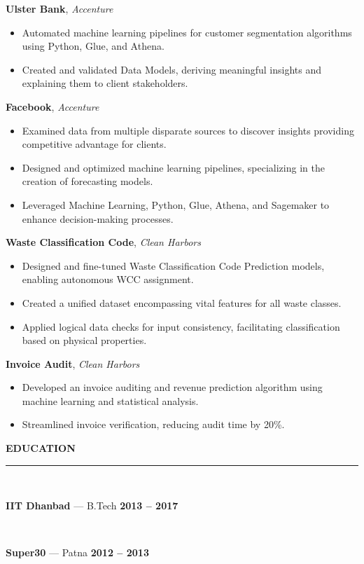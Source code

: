 \documentclass[a4paper,9pt]{article}
\newcommand{\cvsection}[2]{%
  \vspace{4pt}
  {\color{primary}\faIcon{#1}\hspace{6pt}\textbf{\fontsize{10pt}{12pt}\selectfont\uppercase{#2}}}\\[-2pt]
  \color{primary}\rule{\linewidth}{0.8pt}\\[-2pt]
  \color{textcolor}
}
\newcommand{\projectentry}[2]{%
  \vspace{2pt}
  \parbox[t]{\linewidth}{\textbf{\textcolor{projectcolor}{#1}}, \textit{\textcolor{primary}{#2}}}
}
\newcommand{\educationentry}[3]{%
  \vspace{2pt}
  \parbox[t]{\linewidth}{\textbf{#1} --- #2 \hfill \textbf{\textcolor{primary}{#3}}}\\[-1pt]
}
\begin{document}
\begin{paracol}{2}
  \projectentry{Ulster Bank}{Accenture}
  \begin{itemize}
    \item Automated machine learning pipelines for customer segmentation algorithms using Python, Glue, and Athena.
    \item Created and validated Data Models, deriving meaningful insights and explaining them to client stakeholders.
  \end{itemize}

  \projectentry{Facebook}{Accenture}
  \begin{itemize}
    \item Examined data from multiple disparate sources to discover insights providing competitive advantage for clients.
    \item Designed and optimized machine learning pipelines, specializing in the creation of forecasting models.
    \item Leveraged Machine Learning, Python, Glue, Athena, and Sagemaker to enhance decision-making processes.
  \end{itemize}

  \projectentry{Waste Classification Code}{Clean Harbors}
  \begin{itemize}
    \item Designed and fine-tuned Waste Classification Code Prediction models, enabling autonomous WCC assignment.
    \item Created a unified dataset encompassing vital features for all waste classes.
    \item Applied logical data checks for input consistency, facilitating classification based on physical properties.
  \end{itemize}

  \projectentry{Invoice Audit}{Clean Harbors}
  \begin{itemize}
    \item Developed an invoice auditing and revenue prediction algorithm using machine learning and statistical analysis.
    \item Streamlined invoice verification, reducing audit time by 20\%.
  \end{itemize}

  \switchcolumn

  \cvsection{graduation-cap}{Education}
  \small
  \educationentry{IIT Dhanbad}{B.Tech}{2013 -- 2017}
  \educationentry{Super30}{Patna}{2012 -- 2013}


\end{paracol}
\end{document}
